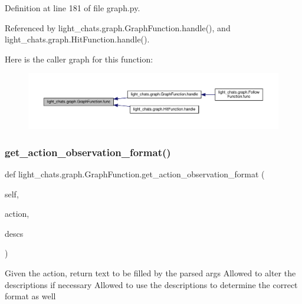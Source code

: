 Definition at line 181 of file graph.\+py.



Referenced by light\+\_\+chats.\+graph.\+Graph\+Function.\+handle(), and light\+\_\+chats.\+graph.\+Hit\+Function.\+handle().

Here is the caller graph for this function\+:
\nopagebreak
\begin{figure}[H]
\begin{center}
\leavevmode
\includegraphics[width=350pt]{classlight__chats_1_1graph_1_1GraphFunction_a9fd67b8cadf1f9be60d4885d21287518_icgraph}
\end{center}
\end{figure}
\mbox{\label{classlight__chats_1_1graph_1_1GraphFunction_a8828c59ad0d9f53bfb2234f0b8b37377}} 
\subsubsection{\texorpdfstring{get\+\_\+action\+\_\+observation\+\_\+format()}{get\_action\_observation\_format()}}
{\footnotesize\ttfamily def light\+\_\+chats.\+graph.\+Graph\+Function.\+get\+\_\+action\+\_\+observation\+\_\+format (\begin{DoxyParamCaption}\item[{}]{self,  }\item[{}]{action,  }\item[{}]{descs }\end{DoxyParamCaption})}

\begin{DoxyVerb}Given the action, return text to be filled by the parsed args
Allowed to alter the descriptions if necessary
Allowed to use the descriptions to determine the correct format as well
\end{DoxyVerb}
 

